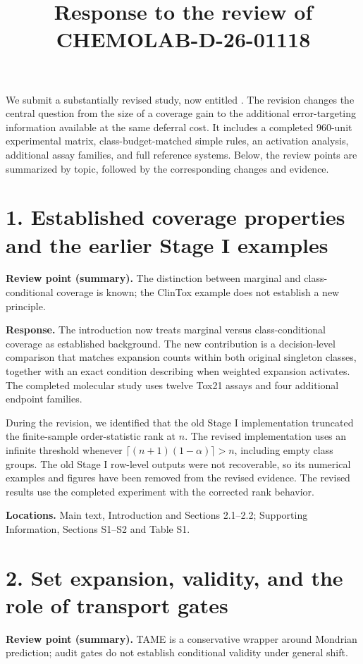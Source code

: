 
\title{Response to the review of CHEMOLAB-D-26-01118}
\author{\jointauthors}
\date{}
\maketitle
We submit a substantially revised study, now entitled \emph{\papertitle}. The revision changes the central question from the size of a coverage gain to the additional error-targeting information available at the same deferral cost. It includes a completed 960-unit experimental matrix, class-budget-matched simple rules, an activation analysis, additional assay families, and full reference systems. Below, the review points are summarized by topic, followed by the corresponding changes and evidence.

\section*{1. Established coverage properties and the earlier Stage I examples}
\noindent\textbf{Review point (summary).} The distinction between marginal and class-conditional coverage is known; the ClinTox example does not establish a new principle.

\textbf{Response.} The introduction now treats marginal versus class-conditional coverage as established background. The new contribution is a decision-level comparison that matches expansion counts within both original singleton classes, together with an exact condition describing when weighted expansion activates. The completed molecular study uses twelve Tox21 assays and four additional endpoint families.

During the revision, we identified that the old Stage I implementation truncated the finite-sample order-statistic rank at $n$. The revised implementation uses an infinite threshold whenever $\lceil(n+1)(1-\alpha)\rceil>n$, including empty class groups. The old Stage I row-level outputs were not recoverable, so its numerical examples and figures have been removed from the revised evidence. The revised results use the completed experiment with the corrected rank behavior.

\textbf{Locations.} Main text, Introduction and Sections 2.1--2.2; Supporting Information, Sections S1--S2 and Table S1.

\section*{2. Set expansion, validity, and the role of transport gates}
\noindent\textbf{Review point (summary).} TAME is a conservative wrapper around Mondrian prediction; audit gates do not establish conditional validity under general shift.

